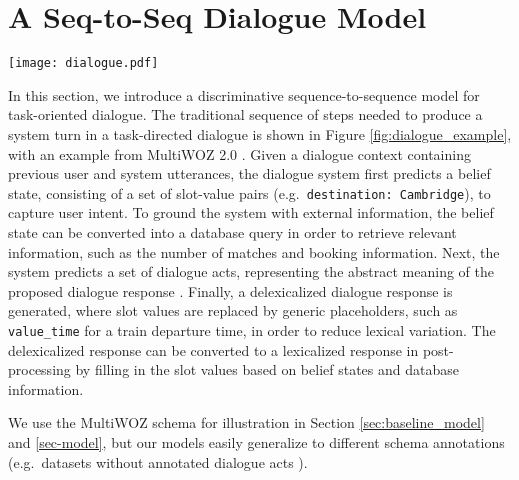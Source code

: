 \documentclass[11pt,a4paper]{article}
\begin{document}
\section{A Seq-to-Seq Dialogue Model \label{sec:baseline_model}}

\begin{figure*}[t]
    \centering
    \texttt{[image: dialogue.pdf]}
\caption{The data flow of one turn in a task-oriented dialogue for train booking from MultiWOZ. }
    \label{fig:dialogue_example}
\end{figure*}



In this section, we introduce a discriminative sequence-to-sequence model for task-oriented dialogue. The traditional sequence of steps needed to produce a system turn in a task-directed dialogue is shown in
Figure \ref{fig:dialogue_example}, with an example from MultiWOZ 2.0 \cite{budzianowski2018multiwoz}. Given a dialogue context containing previous user and system utterances, the dialogue system first predicts a belief state, consisting of a set of slot-value pairs (e.g.\ {\tt destination: Cambridge}), to capture user intent. To ground the system with external information, the belief state can be converted into a database query in order to retrieve relevant information, such as the number of matches and booking information. Next, the system predicts a set of dialogue acts, representing the abstract meaning of the proposed dialogue response \cite{austin1975things}. Finally, a delexicalized dialogue response is generated, where slot values are replaced by generic placeholders, such as {\tt value\_time} for a train departure time, in order to reduce lexical variation. The delexicalized response can be converted to a lexicalized response in post-processing by filling in the slot values based on belief states and database information.

We use the MultiWOZ schema for illustration in Section \ref{sec:baseline_model} and \ref{sec-model}, but our models  easily generalize to different schema annotations (e.g.\ datasets without annotated dialogue acts \cite{andreas2020task}). 
\end{document}

